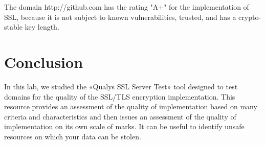 \documentclass[14pt,a4paper,report]{report}
\begin{document}
The domain http://github.com has the rating "A+" for the implementation of SSL, because it is not subject to known vulnerabilities, trusted, and has a crypto-stable key length.

\section{Conclusion}

In this lab, we studied the «Qualys SSL Server Test» tool designed to test domains for the quality of the SSL/TLS encryption implementation. This resource provides an assessment of the quality of implementation based on many criteria and characteristics and then issues an assessment of the quality of implementation on its own scale of marks. It can be useful to identify unsafe resources on which your data can be stolen.
\end{document}
